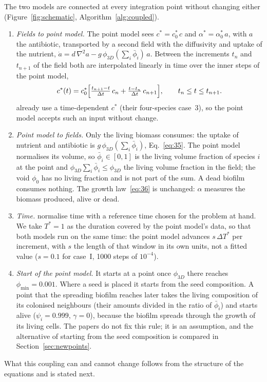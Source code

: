 \documentclass[11pt,a4paper]{article}
\newcommand{\phiD}{\phi_{3D}}
\newcommand{\lv}{\textstyle\sum_i\bar\phi_i}
\begin{document}
The two models are connected at every integration point without changing either (Figure~\ref{fig:schematic}, Algorithm~\ref{alg:coupled}).
\begin{enumerate}
\item \emph{Fields to point model.} The point model sees $c^*=c^*_0\,c$ and $\alpha^*=\alpha^*_0\,a$, with $a$ the antibiotic, transported by a second field with the diffusivity and uptake of the nutrient, $\dot a=d\,\nabla^2a-g\,\phiD(\lv)\,a$. Between the increments $t_n$ and $t_{n+1}$ of the field both are interpolated linearly in time over the inner steps of the point model,
\begin{equation}
c^*(t)=c^*_0\Bigl[\tfrac{t_{n+1}-t}{\Delta t}\,c_n+\tfrac{t-t_n}{\Delta t}\,c_{n+1}\Bigr],\qquad t_n\le t\le t_{n+1}.
\label{eq:cstar}
\end{equation}
\citet{Klempt2026ContinuumBacterialGrowth} already use a time-dependent $c^*$ (their four-species case~3), so the point model accepts such an input without change.
\item \emph{Point model to fields.} Only the living biomass consumes: the uptake of nutrient and antibiotic is $g\,\phiD(\lv)$, Eq.~\eqref{eq:35}. The point model normalises its volume, so $\bar\phi_i\in[0,1]$ is the living volume fraction of species $i$ at the point and $\phiD\lv\le\phiD$ the living volume fraction in the field; the void $\phi_0$ has no living fraction and is not part of the sum. A dead biofilm consumes nothing. The growth law~\eqref{eq:36} is unchanged: $\alpha$ measures the biomass produced, alive or dead.
\item \emph{Time.} \citet{Klempt2024DiffusionDrivenGrowth} normalise time with a reference time chosen for the problem at hand. We take $T^*=1$ as the duration covered by the point model's data, so that both models run on the same time: the point model advances $s\,\Delta T^*$ per increment, with $s$ the length of that window in its own units, not a fitted value ($s=0.1$ for case~I, 1000 steps of $10^{-4}$).
\item \emph{Start of the point model.} It starts at a point once $\phiD$ there reaches $\phi_{\min}=0.001$. Where a seed is placed it starts from the seed composition. A point that the spreading biofilm reaches later takes the living composition of its colonised neighbours (their amounts divided in the ratio of $\bar\phi_i$) and starts alive ($\psi_i=0.999$, $\gamma=0$), because the biofilm spreads through the growth of its living cells. The papers do not fix this rule; it is an assumption, and the alternative of starting from the seed composition is compared in Section~\ref{sec:newpoints}.
\end{enumerate}
What this coupling can and cannot change follows from the structure of the equations and is stated next.
\end{document}
